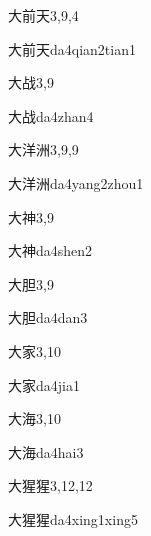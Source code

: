 \begin{entry}{大前天}{3,9,4}
  \begin{phonetics}{大前天}{da4qian2tian1}
  \end{phonetics}
\end{entry}

\begin{entry}{大战}{3,9}
  \begin{phonetics}{大战}{da4zhan4}
  \end{phonetics}
\end{entry}

\begin{entry}{大洋洲}{3,9,9}
  \begin{phonetics}{大洋洲}{da4yang2zhou1}
  \end{phonetics}
\end{entry}

\begin{entry}{大神}{3,9}
  \begin{phonetics}{大神}{da4shen2}
  \end{phonetics}
\end{entry}

\begin{entry}{大胆}{3,9}
  \begin{phonetics}{大胆}{da4dan3}
  \end{phonetics}
\end{entry}

\begin{entry}{大家}{3,10}
  \begin{phonetics}{大家}{da4jia1}
  \end{phonetics}
\end{entry}

\begin{entry}{大海}{3,10}
  \begin{phonetics}{大海}{da4hai3}
  \end{phonetics}
\end{entry}

\begin{entry}{大猩猩}{3,12,12}
  \begin{phonetics}{大猩猩}{da4xing1xing5}
  \end{phonetics}
\end{entry}

